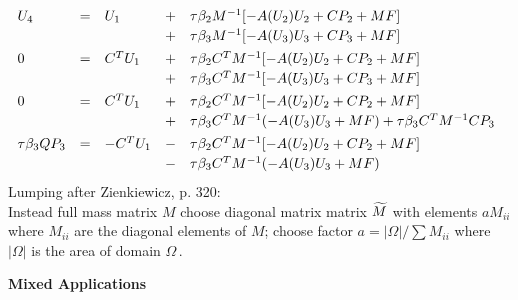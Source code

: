 \documentclass[12pt,a4paper,USenglish,twoside]{book}
\begin{document}
\[
\ba{.}{lllll}
U_4 &=&  U_1 &+& \tau \beta_2 M^{-1}[-A(U_2)U_2 + CP_2 + MF]\\[0.5ex]
&&&+& \tau \beta_3 M^{-1}[-A(U_3)U_3 + CP_3 + MF]\\[1ex]
%
0 &=& C^T U_1 &+& \tau \beta_2C^T M^{-1}[-A(U_2)U_2 + CP_2 + MF]\\[0.5ex]
&&&+& \tau \beta_3C^T M^{-1}[-A(U_3)U_3 + CP_3 + MF]\\[1ex]
%
0 &=& C^T U_1 &+& \tau \beta_2C^T M^{-1}[-A(U_2)U_2 + CP_2 + MF]\\[0.5ex]
&&&+& \tau \beta_3C^T M^{-1}(-A(U_3)U_3 + MF) + \tau \beta_3C^T M^{-1}CP_3\\[1ex]
%
\tau \beta_3QP_3  &=&
- C^T U_1 &-& \tau \beta_2C^T M^{-1}[-A(U_2)U_2 + CP_2 + MF]\\[0.5ex]
&&&-& \tau \beta_3C^T M^{-1}(-A(U_3)U_3 + MF) 
\ea{.}
\]
\newpage
Lumping after Zienkiewicz, p. 320:\\
Instead full mass matrix $M$ choose diagonal matrix matrix $\widetilde{M}$ with 
elements $aM_{ii}$ where $M_{ii}$ are the diagonal elements of $M$; choose factor
$a = |\Omega|/\sum M_{ii}$ where $|\Omega|$ is the area of domain $\Omega$\,.

{\bf \large Mixed Applications}
\end{document}
